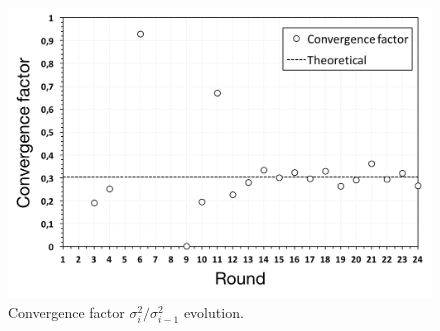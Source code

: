 \begin{figure}[ht]
  \centering
  \includegraphics[keepaspectratio=true, width=\textwidth]{images/counting_conv_factor}\caption{Convergence factor $\sigma_i^2 / \sigma_{i-1}^2$ evolution.}
  \label{fig:counting_conv_factor}
\end{figure}
